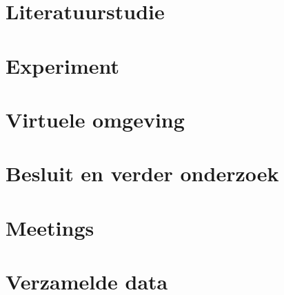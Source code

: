 \documentclass[a4paper,12pt]{report}
\begin{document}
\tableofcontents


\chapter{Literatuurstudie}


\chapter{Experiment}


\chapter{Virtuele omgeving}


\chapter{Besluit en verder onderzoek}



\appendix

\chapter{Meetings}


\chapter{Verzamelde data}



\newpage


\end{document}

